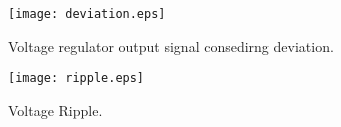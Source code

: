 \begin{figure}[h] \centering
\texttt{[image: deviation.eps]}
\caption{Voltage regulator output signal consedirng deviation.}
\label{fig:deviation}
\end{figure}

\begin{figure}[h] \centering
\texttt{[image: ripple.eps]}
\caption{Voltage Ripple.}
\label{fig:ripple}
\end{figure}



